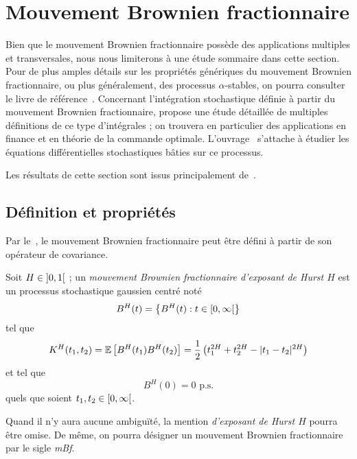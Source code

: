 \section{Mouvement Brownien fractionnaire}
\label{sec:fBm-1d}

Bien que le mouvement Brownien fractionnaire possède des applications
multiples et transversales, nous nous limiterons à une étude sommaire
dans cette section. Pour de plus amples détails sur les propriétés
génériques du mouvement Brownien fractionnaire, ou plus généralement,
des processus $\alpha$-stables, on pourra consulter le livre de
référence~\cite{samorodnitsky1994}. Concernant l'intégration
stochastique définie à partir du mouvement Brownien fractionnaire,
\cite{biagini2008} propose une étude détaillée de multiples
définitions de ce type d'intégrales ; on trouvera en particulier des
applications en finance et en théorie de la commande
optimale. L'ouvrage~\cite{mishura2008} s'attache à étudier les
équations différentielles stochastiques bâties sur ce processus.

Les résultats de cette section sont issus principalement
de~\cite{biagini2008,nourdin2012}.

\subsection{Définition et propriétés}
\label{subsec:fBm-def}

Par le~, le mouvement Brownien fractionnaire peut
être défini à partir de son opérateur de covariance.

\begin{definition}
  \label{def:fBm}
  Soit $H\in\left]0,1\right[$ ; un \emph{mouvement Brownien fractionnaire
    d'exposant de Hurst $H$} est un processus stochastique gaussien
  centré noté
  \[ B^H(t) = \left\{B^H(t) : t \in \left[0,\infty\right[\right\} \] tel
  que
  \begin{align}
    \label{eqn:fBm-cov}
    K^H(t_1,t_2) = \mathbb{E}\left[B^H(t_1)B^H(t_2)\right] = \frac{1}{2}\left(t_1^{2H}+t_2^{2H}-|t_1-t_2|^{2H}\right)
  \end{align}
  et tel que \[ B^H(0) = 0 \text{ p.s.} \] quels que soient
  $t_1,t_2\in\left[0,\infty\right[$.
\end{definition}

\begin{notation}
  Quand il n'y aura aucune ambiguïté, la mention \emph{\og d'exposant
    de Hurst $H$\fg{}} pourra être omise. De même, on pourra désigner
  un mouvement Brownien fractionnaire par le sigle \emph{\og
    mBf\fg{}}.
\end{notation}

